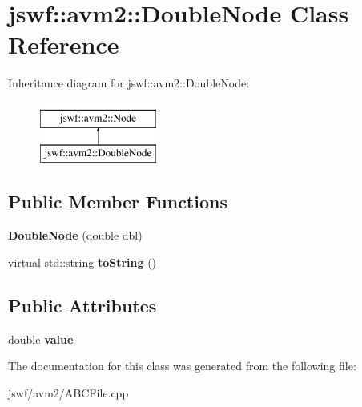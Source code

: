 \hypertarget{classjswf_1_1avm2_1_1_double_node}{\section{jswf\+:\+:avm2\+:\+:Double\+Node Class Reference}
\label{classjswf_1_1avm2_1_1_double_node}
}
Inheritance diagram for jswf\+:\+:avm2\+:\+:Double\+Node\+:\begin{figure}[H]
\begin{center}
\leavevmode
\includegraphics[height=2.000000cm]{classjswf_1_1avm2_1_1_double_node}
\end{center}
\end{figure}
\subsection*{Public Member Functions}
\begin{DoxyCompactItemize}
\item 
\hypertarget{classjswf_1_1avm2_1_1_double_node_a2dd7e76f99401f065b8de080785b4de3}{{\bfseries Double\+Node} (double dbl)}\label{classjswf_1_1avm2_1_1_double_node_a2dd7e76f99401f065b8de080785b4de3}

\item 
\hypertarget{classjswf_1_1avm2_1_1_double_node_aec049003347856996fa726fb8a152831}{virtual std\+::string {\bfseries to\+String} ()}\label{classjswf_1_1avm2_1_1_double_node_aec049003347856996fa726fb8a152831}

\end{DoxyCompactItemize}
\subsection*{Public Attributes}
\begin{DoxyCompactItemize}
\item 
\hypertarget{classjswf_1_1avm2_1_1_double_node_a05f2e564e63fb59166bceeafc72f2bfc}{double {\bfseries value}}\label{classjswf_1_1avm2_1_1_double_node_a05f2e564e63fb59166bceeafc72f2bfc}

\end{DoxyCompactItemize}


The documentation for this class was generated from the following file\+:\begin{DoxyCompactItemize}
\item 
jswf/avm2/A\+B\+C\+File.\+cpp\end{DoxyCompactItemize}
